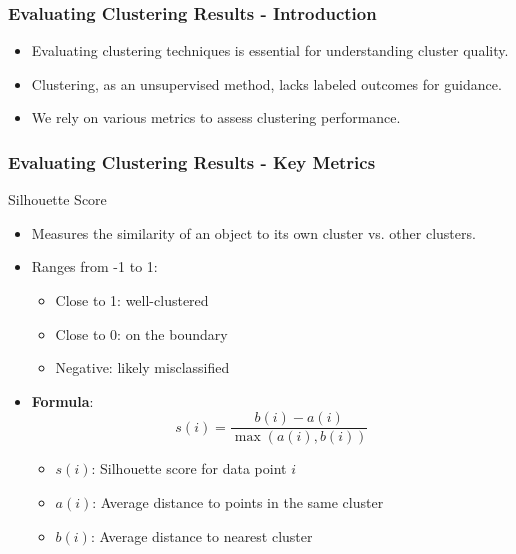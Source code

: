 \documentclass[aspectratio=169]{beamer}
\begin{document}
\begin{frame}[fragile]
    \frametitle{Evaluating Clustering Results - Introduction}
    \begin{itemize}
        \item Evaluating clustering techniques is essential for understanding cluster quality.
        \item Clustering, as an unsupervised method, lacks labeled outcomes for guidance.
        \item We rely on various metrics to assess clustering performance.
    \end{itemize}
\end{frame}

\begin{frame}[fragile]
    \frametitle{Evaluating Clustering Results - Key Metrics}
    \begin{block}{Silhouette Score}
        \begin{itemize}
            \item Measures the similarity of an object to its own cluster vs. other clusters.
            \item Ranges from -1 to 1:
                \begin{itemize}
                    \item Close to 1: well-clustered
                    \item Close to 0: on the boundary
                    \item Negative: likely misclassified
                \end{itemize}
            \item \textbf{Formula}:
            \begin{equation}
                s(i) = \frac{b(i) - a(i)}{\max(a(i), b(i))}
            \end{equation}
            \begin{itemize}
                \item \( s(i) \): Silhouette score for data point \( i \)
                \item \( a(i) \): Average distance to points in the same cluster
                \item \( b(i) \): Average distance to nearest cluster
            \end{itemize}
        \end{itemize}
    \end{block}
\end{frame}
\end{document}
